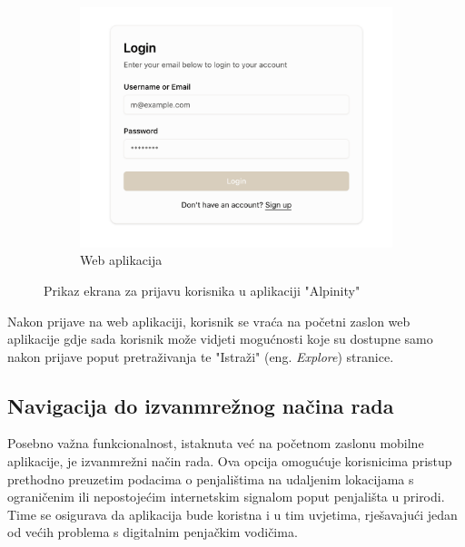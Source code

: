 \begin{figure}[H]
\begin{subfigure}{.5\textwidth}
  \includegraphics[width=1\linewidth]{images/implementacija/web/login.png}
  \caption{Web aplikacija}
  \label{fig:prijava2}
\end{subfigure}
\caption{Prikaz ekrana za prijavu korisnika u aplikaciji "Alpinity"}
\label{fig:prijava_usporedba}
\end{figure}

Nakon prijave na web aplikaciji, korisnik se vraća na početni zaslon web aplikacije gdje sada korisnik može vidjeti mogućnosti koje su dostupne samo nakon prijave poput pretraživanja te "Istraži" (eng. \textit{Explore}) stranice.


\subsection{Navigacija do izvanmrežnog načina rada}


Posebno važna funkcionalnost, istaknuta već na početnom zaslonu mobilne aplikacije, je izvanmrežni način rada. Ova opcija omogućuje korisnicima pristup prethodno preuzetim podacima o penjalištima na udaljenim lokacijama s ograničenim ili nepostojećim internetskim signalom poput penjališta u prirodi. Time se osigurava da aplikacija bude koristna i u tim uvjetima, rješavajući jedan od većih problema s digitalnim penjačkim vodičima.

